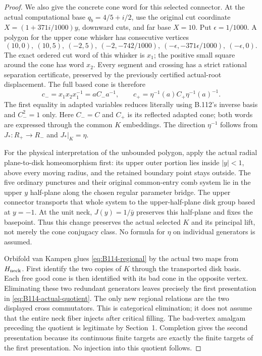 \begin{proof}
We also give the concrete cone word for this selected connector.
At the actual computational base $q_b=4/5+i/2$, use the original
cut coordinate $X=(1+371i/1000)y$, downward cuts, and far base
$X=10$. Put $\epsilon=1/1000$. A polygon for the upper cone
whisker has consecutive vertices
\[
 (10,0),\ (10,5),\ (-2,5),\ (-2,-742/1000),\
 (-\epsilon,-371\epsilon/1000),\ (-\epsilon,0).
\]
The exact ordered cut word of this whisker is $x_1$; the positive
small square around the cone has word $x_2$. Every segment and
crossing has a strict rational separation certificate, preserved
by the previously certified actual-root displacement. The full
based cone is therefore
\begin{equation}\label{eq:B114-actual-gap-cones}
 c_-=x_1x_2x_1^{-1}=aC_-a^{-1},\qquad
 c_+=\eta^{-1}(a)C_+\eta^{-1}(a)^{-1}.
\end{equation}
The first equality in adapted variables reduces literally using
B.112's inverse basis and $C_-^2=1$ only. Here $C_-=C$ and $C_+$
is its reflected adapted cone; both words are expressed through
the common $K$ embeddings. The direction $\eta^{-1}$ follows
from $J_*:R_+\to R_-$ and $J_*|_K=\eta$.

For the physical interpretation of the unbounded polygon, apply
the actual radial plane-to-disk homeomorphism first: its upper
outer portion lies inside $|y|<1$, above every moving radius,
and the retained boundary point stays outside. The five ordinary
punctures and their original common-entry comb system lie in
the upper $y$ half-plane along the chosen regular parameter
bridge. The upper connector transports that whole system to the
upper-half-plane disk group based at $y=-1$. At the unit neck,
$J(y)=1/\bar y$ preserves this half-plane and fixes the basepoint.
Thus this change preserves the actual selected $K$ and its
principal lift, not merely the cone conjugacy class. No formula
for $\eta$ on individual generators is assumed.

Orbifold van Kampen glues \eqref{eq:B114-regional} by the actual
two maps from $H_{\rm neck}$. First identify the two copies of
$K$ through the transported disk basis. Each free good cone is
then identified with its bad cone in the opposite vertex.
Eliminating these two redundant generators leaves precisely the
first presentation in \eqref{eq:B114-actual-quotient}.
The only new regional relations are the two displayed cross
commutators. This is categorical elimination; it does not assume
that the entire neck fiber injects after critical filling.
The bad-vertex amalgam preceding the quotient is legitimate by
Section~1. Completion gives the second presentation because its
continuous finite targets are exactly the finite targets of the
first presentation. No injection into this quotient follows.


\end{proof}
